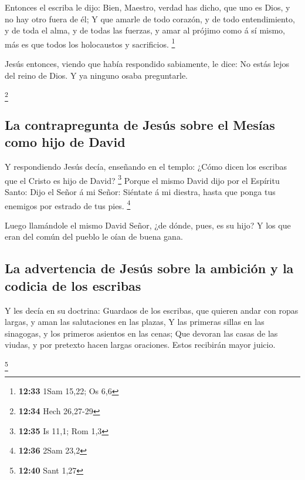  Entonces el escriba le dijo: Bien, Maestro, verdad has
dicho, que uno es Dios, y no hay otro fuera de él;  Y que
amarle de todo corazón, y de todo entendimiento, y de toda el alma, y de
todas las fuerzas, y amar al prójimo como á sí mismo, más es que todos
los holocaustos y sacrificios. \footnote{\textbf{12:33} 1Sam 15,22; Os
  6,6}

 Jesús entonces, viendo que había respondido sabiamente,
le dice: No estás lejos del reino de Dios. Y ya ninguno osaba
preguntarle.

\footnote{\textbf{12:34} Hech 26,27-29}

\hypertarget{la-contrapregunta-de-jesuxfas-sobre-el-mesuxedas-como-hijo-de-david}{%
\subsection{La contrapregunta de Jesús sobre el Mesías como hijo de
David}\label{la-contrapregunta-de-jesuxfas-sobre-el-mesuxedas-como-hijo-de-david}}

 Y respondiendo Jesús decía, enseñando en el templo:
¿Cómo dicen los escribas que el Cristo es hijo de David? \footnote{\textbf{12:35}
  Is 11,1; Rom 1,3}  Porque el mismo David dijo por el
Espíritu Santo: Dijo el Señor á mi Señor: Siéntate á mi diestra, hasta
que ponga tus enemigos por estrado de tus pies. \footnote{\textbf{12:36}
  2Sam 23,2}

 Luego llamándole el mismo David Señor, ¿de dónde, pues,
es su hijo? Y los que eran del común del pueblo le oían de buena gana.

\hypertarget{la-advertencia-de-jesuxfas-sobre-la-ambiciuxf3n-y-la-codicia-de-los-escribas}{%
\subsection{La advertencia de Jesús sobre la ambición y la codicia de
los
escribas}\label{la-advertencia-de-jesuxfas-sobre-la-ambiciuxf3n-y-la-codicia-de-los-escribas}}

 Y les decía en su doctrina: Guardaos de los escribas,
que quieren andar con ropas largas, y aman las salutaciones en las
plazas,  Y las primeras sillas en las sinagogas, y los
primeros asientos en las cenas;  Que devoran las casas de
las viudas, y por pretexto hacen largas oraciones. Estos recibirán mayor
juicio.

\footnote{\textbf{12:40} Sant 1,27}

